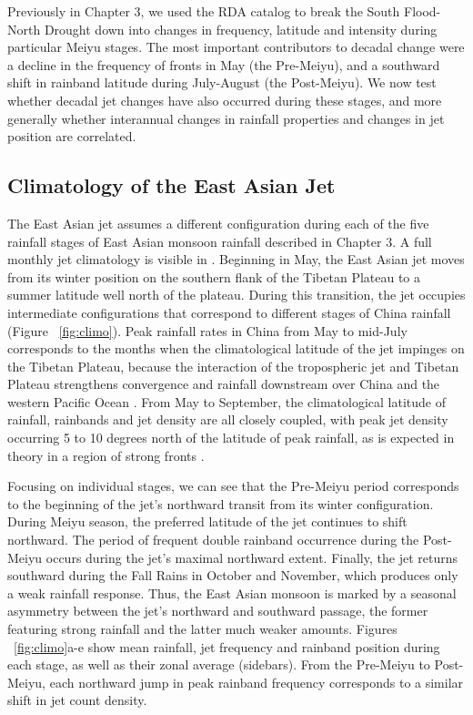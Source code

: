 	Previously in Chapter 3, we used the RDA catalog to break the South Flood-North Drought down into changes in frequency, latitude and intensity during particular Meiyu stages. The most important contributors to decadal change were a decline in the frequency of fronts in May (the Pre-Meiyu), and a southward shift in rainband latitude during July-August (the Post-Meiyu). We now test whether decadal jet changes have also occurred during these stages, and more generally whether interannual changes in rainfall properties and changes in jet position are correlated.
	
\subsection{Climatology of the East Asian Jet}

	The East Asian jet assumes a different configuration during each of the five rainfall stages of East Asian monsoon rainfall described in Chapter 3. A full monthly jet climatology is visible in \citet{Schiemann2009}. Beginning in May, the East Asian jet moves from its winter position on the southern flank of the Tibetan Plateau to a summer latitude well north of the plateau. During this transition, the jet occupies intermediate configurations that correspond to different stages of China rainfall (Figure ~\ref{fig:climo}). Peak rainfall rates in China from May to mid-July corresponds to the months when the climatological latitude of the jet impinges on the Tibetan Plateau, because the interaction of the tropospheric jet and Tibetan Plateau strengthens convergence and rainfall downstream over China and the western Pacific Ocean \citep{Molnar2010,Sampe2010,Chen2014}. From May to September,  the climatological latitude of rainfall, rainbands and jet density are all closely coupled, with peak jet density occurring 5 to 10 degrees north of the latitude of peak rainfall, as is expected in theory in a region of strong fronts \citep{Holton2004}. 
	
	Focusing on individual stages, we can see that the Pre-Meiyu period corresponds to the beginning of the jet's northward transit from its winter configuration. During Meiyu season, the preferred latitude of the jet continues to shift northward. The period of frequent double rainband occurrence during the Post-Meiyu occurs during the jet's maximal northward extent. Finally, the jet returns southward during the Fall Rains in October and November, which produces only a weak rainfall response. Thus, the East Asian monsoon is marked by a seasonal asymmetry between the jet's northward and southward passage, the former featuring strong rainfall and the latter much weaker amounts. Figures ~\ref{fig:climo}a-e show mean rainfall, jet frequency and rainband position during each stage, as well as their zonal average (sidebars). From the Pre-Meiyu to Post-Meiyu, each northward jump in peak rainband frequency corresponds to a similar shift in jet count density.
	
